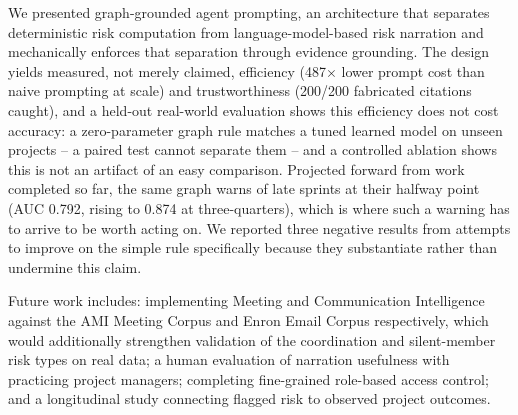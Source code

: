 \documentclass[conference]{IEEEtran}
\begin{document}
We presented graph-grounded agent prompting, an architecture that separates
deterministic risk computation from language-model-based risk narration and
mechanically enforces that separation through evidence grounding. The design yields
measured, not merely claimed, efficiency (487$\times$ lower prompt cost than naive
prompting at scale) and trustworthiness (200/200 fabricated citations caught), and a
held-out real-world evaluation shows this efficiency does not cost accuracy: a
zero-parameter graph rule matches a tuned learned model on unseen projects -- a paired
test cannot separate them -- and a controlled ablation shows this is not an artifact of
an easy comparison. Projected forward from work completed so far, the same graph warns
of late sprints at their halfway point (AUC 0.792, rising to 0.874 at three-quarters),
which is where such a warning has to arrive to be worth acting on. We reported three negative
results from attempts to improve on the simple rule specifically because they
substantiate rather than undermine this claim.

Future work includes: implementing Meeting and Communication Intelligence against
the AMI Meeting Corpus and Enron Email Corpus respectively, which would additionally
strengthen validation of the coordination and silent-member risk types on real data;
a human evaluation of narration usefulness with practicing project managers;
completing fine-grained role-based access control; and a longitudinal study
connecting flagged risk to observed project outcomes.
\end{document}
